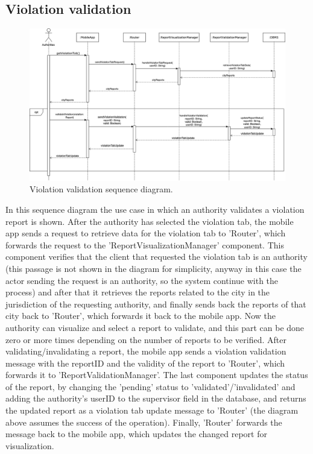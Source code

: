 \subsection{Violation validation}
\begin{figure}[H]
	\centering
	\includegraphics[width=\linewidth]{Images/SequenceDiagramViolationValidation}
	\caption{Violation validation sequence diagram.}
\end{figure}
In this sequence diagram the use case in which an authority validates a violation report is shown. After the authority has selected the violation tab, the mobile app sends a request to retrieve data for the violation tab to 'Router', which forwards the request to the 'ReportVisualizationManager' component. This component verifies that the client that requested the violation tab is an authority (this passage is not shown in the diagram for simplicity, anyway in this case the actor sending the request is an authority, so the system continue with the process) and after that it retrieves the reports related to the city in the jurisdiction of the requesting authority, and finally sends back the reports of that city back to 'Router', which forwards it back to the mobile app. Now the authority can visualize and select a report to validate, and this part can be done zero or more times depending on the number of reports to be verified. After validating/invalidating a report, the mobile app sends a violation validation message with the reportID and the validity of the report to 'Router', which forwards it to 'ReportValidationManager'. The last component updates the status of the report, by changing the 'pending' status to 'validated'/'invalidated' and adding the authority's userID to the supervisor field in the database, and returns the updated report as a violation tab update message to 'Router' (the diagram above assumes the success of the operation). Finally, 'Router' forwards the message back to the mobile app, which updates the changed report for visualization.

